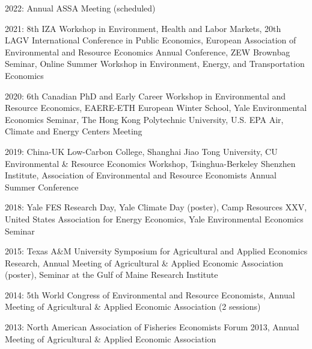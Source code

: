 

\begin{pubitems} %
	\item {2022: Annual ASSA Meeting (scheduled)}
    \item {2021: 8th IZA Workshop in Environment, Health and Labor Markets, 20th LAGV International Conference in Public Economics, European Association of Environmental and Resource Economics Annual Conference, ZEW Brownbag Seminar, Online Summer Workshop in Environment, Energy, and Transportation Economics}
    \item {2020: 6th Canadian PhD and Early Career Workshop in Environmental and Resource Economics, EAERE-ETH European Winter School, Yale Environmental Economics Seminar, The Hong Kong Polytechnic University, U.S. EPA Air, Climate and Energy Centers Meeting}
    \item {2019: China-UK Low-Carbon College, Shanghai Jiao Tong University, CU Environmental \& Resource Economics Workshop, Tsinghua-Berkeley Shenzhen Institute, Association of Environmental and Resource Economists Annual Summer Conference}
    \item {2018: Yale FES Research Day, Yale Climate Day (poster), Camp Resources XXV, United States Association for Energy Economics, Yale Environmental Economics Seminar}
    \item {2015: Texas A\&M University Symposium for Agricultural and Applied Economics Research, Annual Meeting of Agricultural \& Applied Economic Association (poster), Seminar at the Gulf of Maine Research Institute}
    \item {2014: 5th World Congress of Environmental and Resource Economists, Annual Meeting of Agricultural \& Applied Economic Association (2 sessions)}
    \item {2013: North American Association of Fisheries Economists Forum 2013, Annual Meeting of Agricultural \& Applied Economic Association}
\end{pubitems}
